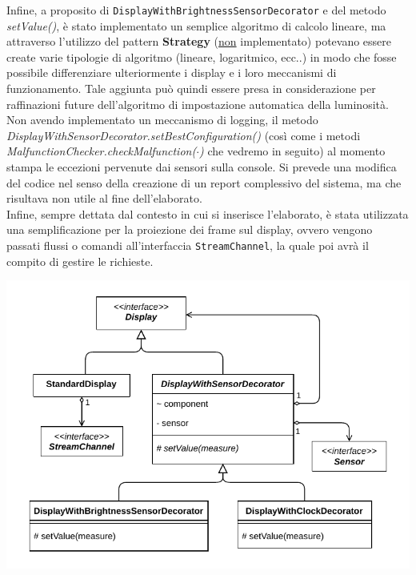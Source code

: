 \documentclass[a4paper,11pt]{article}
\begin{document}
	Infine, a proposito di \texttt{DisplayWithBrightnessSensorDecorator} e del metodo \textit{setValue()}, è stato implementato un semplice algoritmo di calcolo lineare, ma attraverso l'utilizzo del pattern \textbf{Strategy} (\underline{non} implementato) potevano essere create varie tipologie di algoritmo (lineare, logaritmico, ecc..) in modo che fosse possibile differenziare ulteriormente i display e i loro meccanismi di funzionamento.
	Tale aggiunta può quindi essere presa in considerazione per raffinazioni future dell'algoritmo di impostazione automatica della luminosità.\\
	Non avendo implementato un meccanismo di logging, il metodo \textit{DisplayWithSensorDecorator.setBestConfiguration()} (così come i metodi \textit{MalfunctionChecker.checkMalfunction($\cdot$)} che vedremo in seguito) al momento stampa le eccezioni pervenute dai sensori sulla console. Si prevede una modifica del codice nel senso della creazione di un report complessivo del sistema, ma che risultava non utile al fine dell'elaborato.\\
	Infine, sempre dettata dal contesto in cui si inserisce l'elaborato, è stata utilizzata una semplificazione per la proiezione dei frame sul display, ovvero vengono passati flussi o comandi all'interfaccia \texttt{StreamChannel}, la quale poi avrà il compito di gestire le richieste.\\
	\begin{minipage}[c]{\textwidth}
		\centering
		\includegraphics[width=.5\textwidth]{diagramma/ClassDiagramm-DisplayHierarchy.pdf}
		\label{fig:display}
	\end{minipage}	
	
\end{document}
